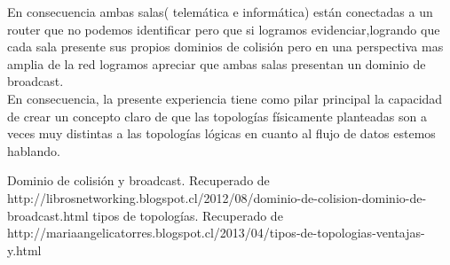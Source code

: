 \documentclass[spanish]{udpreport}
\begin{document}
En consecuencia ambas salas( telemática e informática) están conectadas a un router que no podemos identificar pero que 
si logramos evidenciar,logrando que cada sala presente sus propios dominios de colisión pero en una perspectiva mas amplia 
de la red logramos apreciar que ambas salas presentan un dominio de broadcast.
\\[0.2cm]
En consecuencia, la presente experiencia tiene como pilar principal la capacidad de crear un concepto claro de que las
topologías físicamente planteadas son a veces muy distintas a las topologías lógicas en cuanto al flujo de datos 
estemos hablando.

\begin{thebibliography}{0}
Dominio de colisión y broadcast. Recuperado de http://librosnetworking.blogspot.cl/2012/08/dominio-de-colision-dominio-de-broadcast.html
tipos de topologías. Recuperado de http://mariaangelicatorres.blogspot.cl/2013/04/tipos-de-topologias-ventajas-y.html
\end{thebibliography}
\listoffigures
\end{document}

